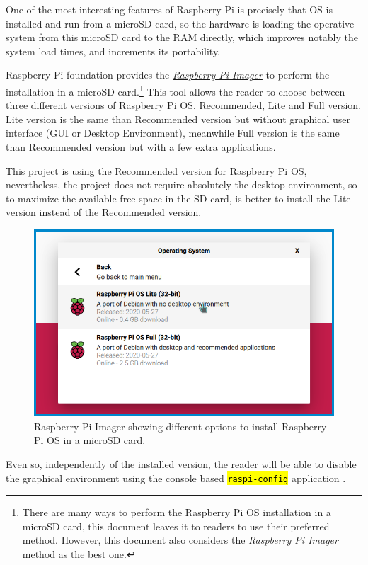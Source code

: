 \documentclass[11pt,a4paper,dvipsnames,twoside]{article}
\newcommand{\cmd}[1] {\hl{\texttt{#1}}}
\begin{document}
One of the most interesting features of Raspberry Pi is precisely that OS is installed and run from a microSD card, so the hardware is loading the operative system from this microSD card to the RAM directly, which improves notably the system load times, and increments its portability.

Raspberry Pi foundation provides the \href{https://www.raspberrypi.org/downloads/noobs/}{\textit{Raspberry Pi Imager}} to perform the installation in a microSD card.\footnote{There are many ways to perform the Raspberry Pi OS installation in a microSD card, this document leaves it to readers to use their preferred method. However, this document also considers the \textit{Raspberry Pi Imager} method as the best one.} This tool allows the reader to choose between three different versions of Raspberry Pi OS. Recommended, Lite and Full version. Lite version is the same than Recommended version but without graphical user interface (GUI or Desktop Environment), meanwhile Full version is the same than Recommended version but with a few extra applications.

This project is using the Recommended version for Raspberry Pi OS, nevertheless, the project does not require absolutely the desktop environment, so to maximize the available free space in the SD card, is better to install the Lite version instead of the Recommended version.

\begin{figure}[htp]
  \centering
  \includegraphics[width=.9\textwidth]{../pictures/rpi_imager.png}
  \caption{Raspberry Pi Imager showing different options to install Raspberry Pi OS in a microSD card.}
  \label{fig:RpiImager}
\end{figure}

Even so, independently of the installed version, the reader will be able to disable the graphical environment using the console based \cmd{raspi-config} application \cite{RaspiConf}. 
\end{document}
